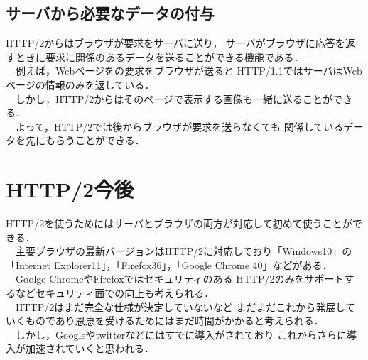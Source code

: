 \documentclass[a4j,9pt,twocolumn]{jsarticle}
\begin{document}
\subsection{サーバから必要なデータの付与}
HTTP/2からはブラウザが要求をサーバに送り，
サーバがブラウザに応答を返すときに要求に関係のあるデータを送ることができる機能である．
\\　例えば，Webページをの要求をブラウザが送ると
HTTP/1.1ではサーバはWebページの情報のみを返している．
\\　しかし，HTTP/2からはそのページで表示する画像も一緒に送ることができる．
\\　よって，HTTP/2では後からブラウザが要求を送らなくても
関係しているデータを先にもらうことができる．



\section{HTTP/2今後}
HTTP/2を使うためにはサーバとブラウザの両方が対応して初めて使うことができる．
\\　主要ブラウザの最新バージョンはHTTP/2に対応しており「Windows10」の「Internet Explorer11」，「Firefox36」，「Google Chrome 40」などがある．
\\　Goolge ChromeやFirefoxではセキュリティのある
HTTP/2のみをサポートするなどセキュリティ面での向上も考えられる．
\\　HTTP/2はまだ完全な仕様が決定していないなど
まだまだこれから発展していくものであり恩恵を受けるためにはまだ時間がかかると考えられる．
\\　しかし，Googleやtwitterなどにはすでに導入がされており
これからさらに導入が加速されていくと思われる．




\small


\end{document}
